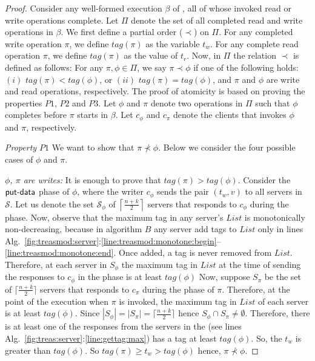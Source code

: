 			\begin{proof}
Consider any well-formed execution $\beta$ of \treasmod, all of whose invoked read or write operations complete. Let $\Pi$ denote the set of all completed read and write operations in $\beta$. We first define a partial order ($\prec$) on $\Pi$. 
For any completed write operation $\pi$, we define $tag(\pi)$ as the variable  $t_w$. For any complete read operation $\pi$, we define $tag(\pi)$ as the value of $t_r$. 
Now, in $\Pi$ the relation $\prec$ is defined as follows: For any $\pi, \phi \in \Pi$, we say $\pi \prec \phi$  if 
one of the following holds: $(i)$  $tag(\pi)  < tag(\phi)$, or $(ii)$ $tag(\pi) = tag(\phi)$, and  $\pi$ and $\phi$ are write and read 
operations, respectively. The proof of atomicity is based on proving 				
 the properties $P1$, $P2$ and $P3$. Let $\phi$ and $\pi$ denote two operations in $\Pi$ such that $\phi$ completes before $\pi$ starts in $\beta$.  Let  $c_{\phi}$ and $c_{\pi}$ denote the clients that invokes $\phi$ and $\pi$, respectively. 

\emph{Property $P1$} We want to show that $\pi \not\prec \phi$. Below we consider the four possible cases of $\phi$ and $\pi$.

\emph{ $\phi$, $\pi$ are writes:} It is enough to prove that $tag(\pi) > tag(\phi)$. Consider the $\act{put-data}$ phase of $\phi$, where the writer $c_{\phi}$  sends the pair $(t_w, v)$ to all 
servers in $\mathcal{S}$. Let us denote the  set $\mathcal{S}_{\phi}$ of $\left\lceil \frac{n+k}{2} \right\rceil$ servers  that responds to $c_{\phi}$ during the  phase.  
Now, observe that the maximum tag in any server's $List$ is monotonically non-decreasing, because in algorithm $B$  
any server add tags to  $List$  only in lines 
Alg.~\ref{fig:treasmod:server}:\ref{line:treasmod:monotone:begin}--\ref{line:treasmod:monotone:end}.  Once added, a tag is never removed from $List$.
Therefore, at  each server in $S_{\phi}$ the maximum tag in $List$ at the time of 
sending the responses to $c_{\phi}$ in the   phase is at least $tag(\phi)$ 
 Now, suppose $S_{\pi}$ be 
the set of $\lceil \frac{n+k}{2} \rceil$ servers that responds to $c_{\pi}$ during the  phase of $\pi$. 
 Therefore, at the point of the execution when $\pi$ is invoked, the maximum
tag in  $List$ of each server is at least $tag(\phi)$. Since $|S_{\phi}| = | S_{\pi}| = \lceil \frac{n+k}{2} \rceil$  hence 
$S_{\phi} \cap S_{\pi} \neq \emptyset $. Therefore, there is at least one of the  responses from the servers in the 
(see lines Alg.~\ref{fig:treas:server}:\ref{line:gettag:max}) has a tag at least $tag(\phi)$. So, the $t_w$ is greater than $tag(\phi)$. So $tag(\pi) \geq t_w > tag(\phi)$ hence, $\pi \not\prec \phi$.
 

\end{proof}
